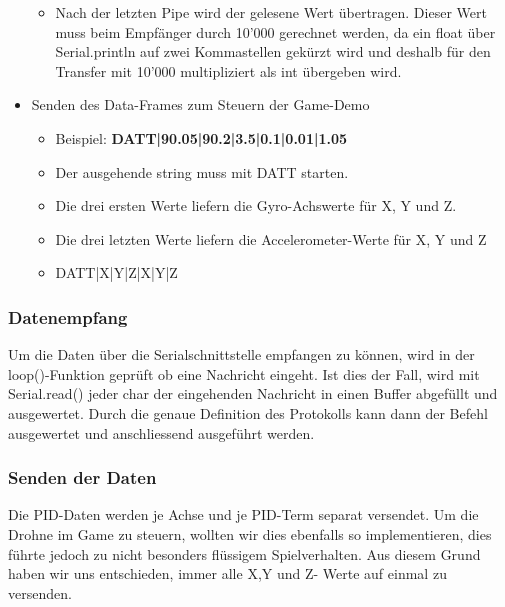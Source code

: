 \begin{itemize}
\begin{itemize}
    \item Nach der letzten Pipe wird der gelesene Wert übertragen. Dieser Wert muss beim Empfänger durch 10'000 gerechnet werden, da ein float über Serial.println auf zwei Kommastellen gekürzt wird und deshalb für den Transfer mit 10'000 multipliziert als int übergeben wird.
  \end{itemize}
  \item Senden des Data-Frames zum Steuern der Game-Demo
  \begin{itemize}
    \item Beispiel: \textbf{DATT|90.05|90.2|3.5|0.1|0.01|1.05}
    \item Der ausgehende string muss mit DATT starten.
    \item Die drei ersten Werte liefern die Gyro-Achswerte für X, Y und Z.
    \item Die drei letzten Werte liefern die Accelerometer-Werte für X, Y und Z
    \item DATT|X|Y|Z|X|Y|Z
  \end{itemize}
\end{itemize} 

\subsubsection{Datenempfang}
Um die Daten über die Serialschnittstelle empfangen zu können, wird in der loop()-Funktion geprüft ob eine Nachricht eingeht. Ist dies der Fall, wird mit Serial.read() jeder char der eingehenden Nachricht in einen Buffer abgefüllt und ausgewertet. Durch die genaue Definition des Protokolls kann dann der Befehl ausgewertet und anschliessend ausgeführt werden.

\subsubsection{Senden der Daten}
Die PID-Daten werden je Achse und je PID-Term separat versendet. Um die Drohne im Game zu steuern, wollten wir dies ebenfalls so implementieren, dies führte jedoch zu nicht besonders flüssigem Spielverhalten. Aus diesem Grund haben wir uns entschieden, immer alle X,Y und Z- Werte auf einmal zu versenden.